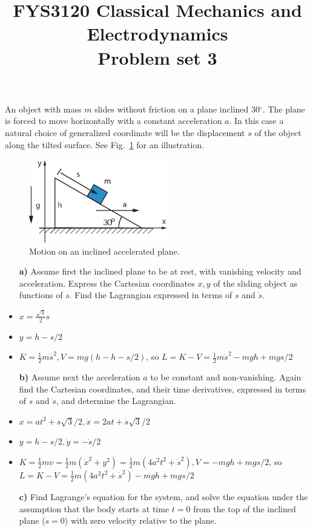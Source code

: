 \documentclass[11pt,a4paper]{report}
\title{FYS3120 Classical Mechanics and Electrodynamics\\ 
\vspace{15mm}Problem set 3}
\newcounter{excount}[chapter]
\newenvironment{exercise}[1][]{\addtocounter{excount}{1} \noindent {\bf Problem
    \arabic{excount} \ \ #1}\hspace{2mm}}{\vspace{4mm}}
\begin{document}
\maketitle


\begin{exercise}
An object with mass $m$ slides without friction on a plane inclined 30$^\circ$. The plane is forced to move horizontally with a constant acceleration $a$. In this case a natural choice of generalized coordinate will be the displacement $s$ of the object along the tilted surface. See Fig.~\ref{fig:incaccplane} for an illustration.

\begin{figure}[h]
\begin{center}
\includegraphics[width=6cm]{AkselerertSkraplan.eps}
\end{center}
\caption{Motion on an inclined accelerated plane.}
\label{fig:incaccplane}
\end{figure}

\begin{itemize}
\item[\bf a)] Assume first the inclined plane to be at rest, with vanishing velocity and acceleration. Express the Cartesian coordinates $x,y$ of the sliding object as functions of $s$. Find the Lagrangian expressed in terms of $s$ and $\dot s$.

\item $x=\frac{\sqrt{3}}{2}s$
\item $y=h-s/2$
\item $K=\frac{1}{2}m\dot{s}^2, V=mg(h-h-s/2)$, so $L=K-V=\frac{1}{2}m\dot{s}^2-mgh+mgs/2$

\item[\bf b)]  Assume next the acceleration $a$ to be constant and non-vanishing. Again find the Cartesian coordinates, and their time derivatives, expressed in terms of $s$ and $\dot s$, and determine the Lagrangian.

\item $x=at^2+s\sqrt{3}/2, \dot{x}=2at+\dot{s}\sqrt{3}/2$
\item $y=h-s/2,\dot{y}=-\dot{s}/2$
\item $K=\frac{1}{2}mv=\frac{1}{2}m( \dot{x}^2+y^2)=\frac{1}{2}m(4a^2 t^2+\dot{s}^2), V=-mgh+mgs/2$, so $L=K-V=\frac{1}{2}m(4a^2 t^2+\dot{s}^2)-mgh+mgs/2$

\item[\bf c)] Find Lagrange's equation for the system, and solve the equation under the assumption that the body starts at time $t=0$ from the top of the inclined plane ($s=0$) with zero velocity relative to the plane.
\end{itemize}
\end{exercise}
\end{document}
